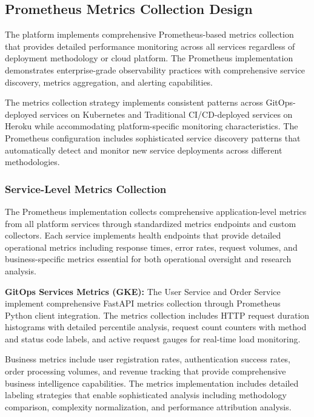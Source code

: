 \subsection{Prometheus Metrics Collection Design}

The platform implements comprehensive Prometheus-based metrics collection that provides detailed performance monitoring across all services regardless of deployment methodology or cloud platform. The Prometheus implementation demonstrates enterprise-grade observability practices with comprehensive service discovery, metrics aggregation, and alerting capabilities.

The metrics collection strategy implements consistent patterns across GitOps-deployed services on Kubernetes and Traditional CI/CD-deployed services on Heroku while accommodating platform-specific monitoring characteristics. The Prometheus configuration includes sophisticated service discovery patterns that automatically detect and monitor new service deployments across different methodologies.

\subsubsection{Service-Level Metrics Collection}

The Prometheus implementation collects comprehensive application-level metrics from all platform services through standardized metrics endpoints and custom collectors. Each service implements health endpoints that provide detailed operational metrics including response times, error rates, request volumes, and business-specific metrics essential for both operational oversight and research analysis.

\textbf{GitOps Services Metrics (GKE):}
The User Service and Order Service implement comprehensive FastAPI metrics collection through Prometheus Python client integration. The metrics collection includes HTTP request duration histograms with detailed percentile analysis, request count counters with method and status code labels, and active request gauges for real-time load monitoring.

Business metrics include user registration rates, authentication success rates, order processing volumes, and revenue tracking that provide comprehensive business intelligence capabilities. The metrics implementation includes detailed labeling strategies that enable sophisticated analysis including methodology comparison, complexity normalization, and performance attribution analysis.

